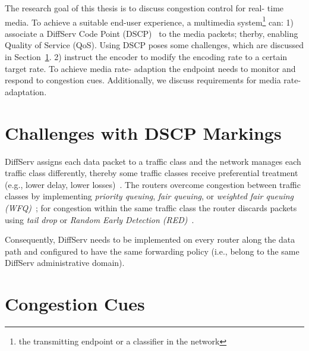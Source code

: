 
The research goal of this thesis is to discuss congestion control for real-
time media. To achieve a suitable end-user experience, a multimedia
system\footnote{the transmitting endpoint or a classifier in the network} can:
1) associate a DiffServ Code Point (DSCP)~\cite{rfc2474} to the media packets;
therby, enabling Quality of Service (QoS). Using DSCP poses some challenges,
which are discussed in Section~\ref{rg.ch.dscp}. 2) instruct the encoder to
modify the encoding rate to a certain target rate. To achieve media rate-
adaption the endpoint needs to monitor and respond to congestion cues.
Additionally, we  discuss requirements for media rate-adaptation.


\section{Challenges with DSCP Markings}
\label{rg.ch.dscp}

DiffServ assigns each data packet to a traffic class and the network manages
each traffic class differently, thereby some traffic classes receive
preferential treatment (e.g., lower delay, lower losses)~\cite{rfc2475}. The
routers overcome congestion between traffic classes by implementing
\emph{priority queuing}, \emph{fair queuing}, or \emph{weighted fair queuing
(WFQ)}~\cite{rfc5865}; for congestion within the same traffic class the
router discards packets using \emph{tail drop} or \emph{Random Early Detection
(RED)}~\cite{Floyd:RED}.

Consequently, DiffServ needs to be implemented on every router along the data
path and configured to have the same forwarding policy (i.e., belong to the
same DiffServ administrative domain). 


\section{Congestion Cues}

